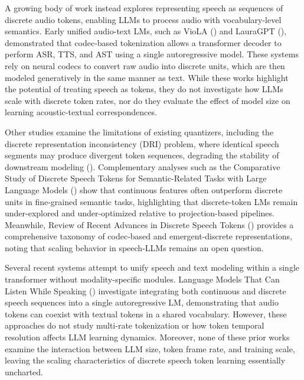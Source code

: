 \documentclass{article}
\begin{document}
A growing body of work instead explores representing speech as sequences of discrete audio tokens, enabling LLMs to process audio with vocabulary-level semantics. Early unified audio-text LMs, such as VioLA (\citep{wang2023violaunifiedcodeclanguage}) and LauraGPT (\citet{du2024lauragptlistenattendunderstand}), demonstrated that codec-based tokenization allows a transformer decoder to perform ASR, TTS, and AST using a single autoregressive model. These systems rely on neural codecs to convert raw audio into discrete units, which are then modeled generatively in the same manner as text. While these works highlight the potential of treating speech as tokens, they do not investigate how LLMs scale with discrete token rates, nor do they evaluate the effect of model size on learning acoustic-textual correspondences.

Other studies examine the limitations of existing quantizers, including the discrete representation inconsistency (DRI) problem, where identical speech segments may produce divergent token sequences, degrading the stability of downstream modeling (\citet{liu2024analyzingmitigatinginconsistencydiscrete}). Complementary analyses such as the Comparative Study of Discrete Speech Tokens for Semantic-Related Tasks with Large Language Models (\citet{wang2024comparativestudydiscretespeech}) show that continuous features often outperform discrete units in fine-grained semantic tasks, highlighting that discrete-token LMs remain under-explored and under-optimized relative to projection-based pipelines. Meanwhile, Review of Recent Advances in Discrete Speech Tokens (\citet{guo2025recentadvancesdiscretespeech}) provides a comprehensive taxonomy of codec-based and emergent-discrete representations, noting that scaling behavior in speech-LLMs remains an open question.

Several recent systems attempt to unify speech and text modeling within a single transformer without modality-specific modules. Language Models That Can Listen While Speaking (\citet{ma2024languagemodellistenspeaking}) investigate integrating both continuous and discrete speech sequences into a single autoregressive LM, demonstrating that audio tokens can coexist with textual tokens in a shared vocabulary. However, these approaches do not study multi-rate tokenization or how token temporal resolution affects LLM learning dynamics. Moreover, none of these prior works examine the interaction between LLM size, token frame rate, and training scale, leaving the scaling characteristics of discrete speech token learning essentially uncharted.
\end{document}
